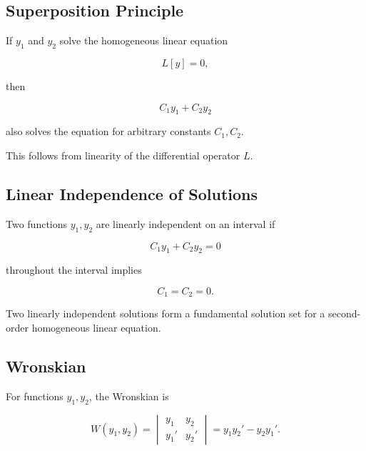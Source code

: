 \subsection{Superposition Principle}
\label{subsec:ode-superposition}

\begin{theorem}
If \(y_1\) and \(y_2\) solve the homogeneous linear equation

\[
L[y]=0,
\]

then

\[
\boxed{
C_1y_1+C_2y_2
}
\]

also solves the equation for arbitrary constants \(C_1,C_2\).
\end{theorem}

This follows from linearity of the differential operator \(L\).

\subsection{Linear Independence of Solutions}
\label{subsec:linear-independence-ode-solutions}

Two functions \(y_1,y_2\) are linearly independent on an interval if

\[
\boxed{
C_1y_1+C_2y_2=0
}
\]

throughout the interval implies

\[
\boxed{
C_1=C_2=0.
}
\]

Two linearly independent solutions form a fundamental solution set for a
second-order homogeneous linear equation.

\subsection{Wronskian}
\label{subsec:wronskian}

For functions \(y_1,y_2\), the Wronskian is

\[
\boxed{
W(y_1,y_2)
=
\begin{vmatrix}
y_1 & y_2\\
y_1' & y_2'
\end{vmatrix}
=
y_1y_2'
-
y_2y_1'.
}
\]

